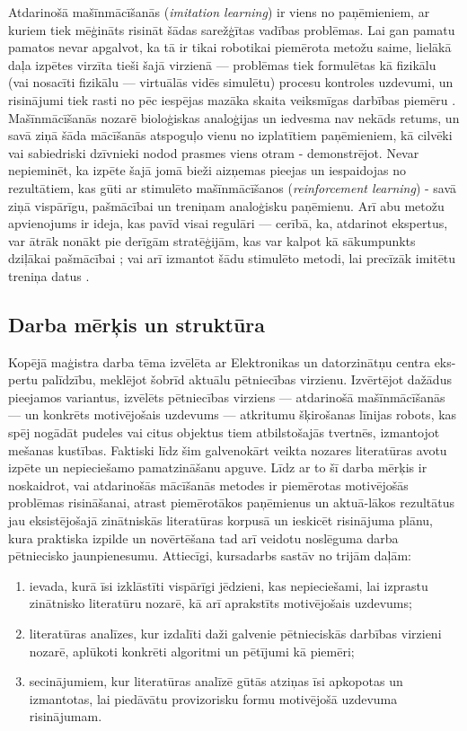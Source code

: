 \documentclass[12pt, a4paper]{article}
\numberwithin{equation}{section} %
\begin{document}
Atdarinošā mašīnmācīšanās (\textit{imitation learning}) ir viens no paņēmieniem, ar kuriem tiek mēģināts risināt šādas sarežģītas vadības problēmas. Lai gan pamatu pamatos nevar apgalvot, ka tā ir tikai robotikai piemērota metožu saime, lielākā daļa izpētes virzīta tieši šajā virzienā --- problēmas tiek formulētas kā fizikālu (vai nosacīti fizikālu --- virtuālās vidēs simulētu) procesu kontroles uzdevumi, un risinājumi tiek rasti no pēc iespējas mazāka skaita veiksmīgas darbības piemēru \cite{attia2018global}. Mašīnmācīšanās nozarē bioloģiskas analoģijas un iedvesma nav nekāds retums, un savā ziņā šāda mācīšanās  atspoguļo vienu no izplatītiem paņēmieniem, kā cilvēki vai sabiedriski dzīvnieki nodod prasmes viens otram - demonstrējot. Nevar nepieminēt, ka izpēte šajā jomā bieži aizņemas pieejas un iespaidojas no rezultātiem, kas gūti ar stimulēto mašīnmācīšanos (\textit{reinforcement learning}) - savā ziņā vispārīgu, pašmācībai un treniņam analoģisku paņēmienu. Arī abu metožu apvienojums ir ideja, kas pavīd visai regulāri --- cerībā, ka, atdarinot ekspertus, var ātrāk nonākt pie derīgām stratēģijām, kas var kalpot kā sākumpunkts dziļākai pašmācībai \cite{hester2018deep}; vai arī izmantot šādu stimulēto metodi, lai precīzāk imitētu treniņa datus \cite{abbeel2004apprenticeship}.

\subsection*{Darba mērķis un struktūra} %

Kopējā maģistra darba tēma izvēlēta ar Elektronikas un datorzinātņu centra eks-pertu palīdzību, meklējot šobrīd aktuālu pētniecības virzienu. Izvērtējot dažādus pieejamos variantus, izvēlēts pētniecības virziens --- atdarinošā mašīnmācīšanās --- un konkrēts motivējošais uzdevums --- atkritumu šķirošanas līnijas robots, kas spēj nogādāt pudeles vai citus objektus tiem atbilstošajās tvertnēs, izmantojot mešanas kustības. Faktiski līdz šim galvenokārt veikta nozares literatūras avotu izpēte un nepieciešamo pamatzināšanu apguve. Līdz ar to šī darba mērķis ir noskaidrot, vai atdarinošās mācīšanās metodes ir piemērotas motivējošās problēmas risināšanai, atrast piemērotākos paņēmienus un aktuā-lākos rezultātus jau eksistējošajā zinātniskās literatūras korpusā un ieskicēt risinājuma plānu, kura praktiska izpilde un novērtēšana tad arī veidotu noslēguma darba pētniecisko jaunpienesumu. Attiecīgi, kursadarbs sastāv no trijām daļām:
\begin{enumerate}
    \item ievada, kurā īsi izklāstīti vispārīgi jēdzieni, kas nepieciešami, lai izprastu zinātnisko literatūru nozarē, kā arī aprakstīts motivējošais uzdevums;
    \item literatūras analīzes, kur izdalīti daži galvenie pētnieciskās darbības virzieni nozarē, aplūkoti konkrēti algoritmi un pētījumi kā piemēri;
    \item secinājumiem, kur literatūras analīzē gūtās atziņas īsi apkopotas un izmantotas, lai piedāvātu provizorisku formu motivējošā uzdevuma risinājumam.
\end{enumerate}
\end{document}
